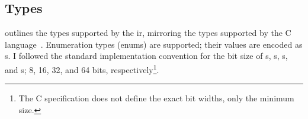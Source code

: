 \documentclass[00-main.tex]{subfiles}
\begin{document}
%
%
%

\subsection{Types}

 outlines the types supported by the \gls{ir}, mirroring the types supported by the C language~.
Enumeration types (enums) are supported; their values are encoded as s.
I followed the standard implementation convention for the bit size of s, s, s, and s; 8, 16, 32, and 64 bits, respectively\footnote{The C specification does not define the exact bit widths, only the minimum size.}.
\end{document}
